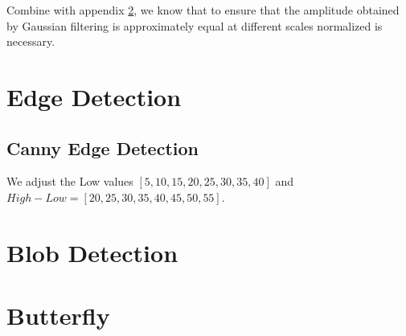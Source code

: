 \documentclass[final]{cvpr}
\begin{document}
Combine with appendix \ref{sec: allblob}, we know that to ensure that the amplitude obtained by Gaussian filtering is approximately equal at different scales normalized is necessary.  


\clearpage

\onecolumn

\begin{appendices}\label{append}

\section{Edge Detection}\label{sec: allcanny}
\subsection{Canny Edge Detection}
We adjust the Low values $[5,10,15,20,25,30,35,40]$ and $High-Low=[20,25,30,35,40,45,50,55]$.



\section{Blob Detection}\label{sec: allblob}



\section{Butterfly}





\end{appendices}
\end{document}
